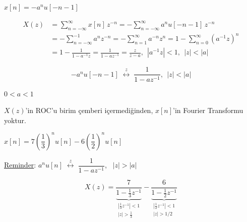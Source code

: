 \documentclass[11pt,a4paper]{article}
\begin{document}
\begin{ornek}
  $x[n]=-a^n u[-n-1]$
\end{ornek}
\begin{align*}
  X(z)&=\sum_{n=-\infty}^{\infty}x[n]\,z^{-n}=-\sum_{n=-\infty}^{\infty}a^n u[-n-1]\,z^{-n}\\
  &=-\sum_{n=-\infty}^{-1}a^n z^{-n}=-\sum_{n=1}^{\infty}a^{-n}z^{n}=1-\sum_{n=0}^{\infty}(a^{-1}z)^n\\
  &=1-\frac{1}{1-a^{-1}z}=\frac{1}{1-az^{-1}}=\frac{z}{z-a},\ \ |a^{-1}z|<1,\ \ |z|<|a|
\end{align*}

\nopagebreak
\[ -a^nu[-n-1]\;\overset{z}{\longleftrightarrow}\;\frac{1}{1-az^{-1}},\ \ |z|<|a| \]

\noindent
\begin{minipage}[c]{0.55\linewidth}
  \centering
\end{minipage}\hfill
\begin{minipage}[c]{0.3\linewidth}
  $0<a<1$
\end{minipage}

\noindent $X(z)$'in ROC'u birim çemberi içermediğinden, $x[n]$'in Fourier Transformu yoktur.

\begin{ornek}
  $x[n]=7\left(\dfrac{1}{3}\right)^{n}u[n]-6\left(\dfrac{1}{2}\right)^{n}u[n]$
\end{ornek}
\noindent \underline{Reminder}: $a^nu[n]\;\overset{z}{\longleftrightarrow}\;\dfrac{1}{1-az^{-1}}$, \ $|z|>|a|$

\[ X(z)=\frac{7}{\underbrace{1-\frac{1}{3}z^{-1}}_{\begin{array}{c}\left|\frac{1}{3}z^{-1}\right|<1\\[1mm] |z|>\frac{1}{3}\end{array}}}
 -\frac{6}{\underbrace{1-\frac{1}{2}z^{-1}}_{\begin{array}{c}\left|\frac{1}{2}z^{-1}\right|<1\\[1mm] |z|>1/2\end{array}}} \]
\end{document}
